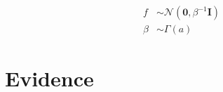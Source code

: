 \documentclass[10pt, a4paper, twocolumn]{article} %
\begin{document}
\begin{align}
  f &\sim \mathcal{N}\left(\boldsymbol{0},\beta^{-1}\mathbf{I}\right)\\
  \beta &\sim \Gamma(a)
\end{align}

\section{Evidence}


\printbibliography[title={Bibliography}] %

\end{document}
